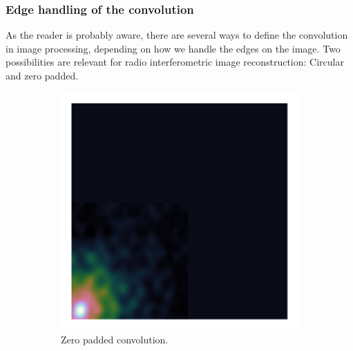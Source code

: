 \subsubsection{Edge handling of the convolution}
As the reader is probably aware, there are several ways to define the convolution in image processing, depending on how we handle the edges on the image. Two possibilities are relevant for radio interferometric image reconstruction: Circular and zero padded.

\begin{figure}[h]
	\centering
	\begin{subfigure}[b]{0.3\linewidth}
		\includegraphics[width=\linewidth, clip, trim= 0.25in 0.25in 0.25in 0.25in]{./chapters/03.cd/simulated/psfZeroPadding.png}
		\caption{Zero padded convolution.}
		\label{cd:efficient:convolution:padded}
	\end{subfigure}
	\begin{subfigure}[b]{0.3\linewidth}

\end{subfigure}
\end{figure}
